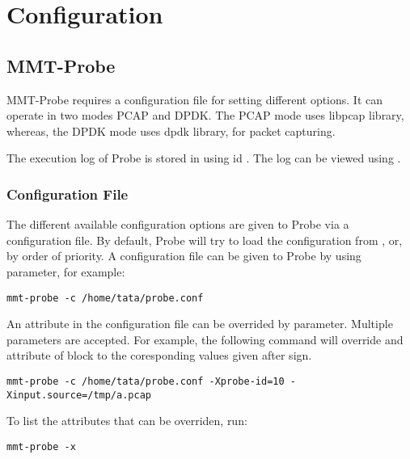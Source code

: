 \clearpage

\section{Configuration}
\label{configuration}

\subsection{MMT-Probe}

MMT-Probe requires a configuration file for setting different options. 
It can operate in two modes PCAP and DPDK. 
The PCAP mode uses libpcap library, whereas, the DPDK mode uses dpdk library, for packet capturing.  

The execution log of Probe is stored in  using id . 
The log can be viewed using .


\subsubsection{Configuration File}

The different available configuration options are given to Probe via a configuration file. 
By default, Probe will try to load the configuration from , or, 
by order of priority. A configuration file can be given to Probe by using  parameter, for example:

\begin{lstlisting}[style=CONFIG]
mmt-probe -c /home/tata/probe.conf
\end{lstlisting}

\note An attribute in the configuration file can be overrided by  parameter.
Multiple  parameters are accepted. 
For example, the following command will override  and  attribute of  block to the coresponding values given after \inlineCode{=} sign.

\begin{lstlisting}[style=CONFIG]
mmt-probe -c /home/tata/probe.conf -Xprobe-id=10 -Xinput.source=/tmp/a.pcap
\end{lstlisting}

To list the attributes that can be overriden, run:

\begin{lstlisting}[style=CONFIG]
mmt-probe -x
\end{lstlisting}

